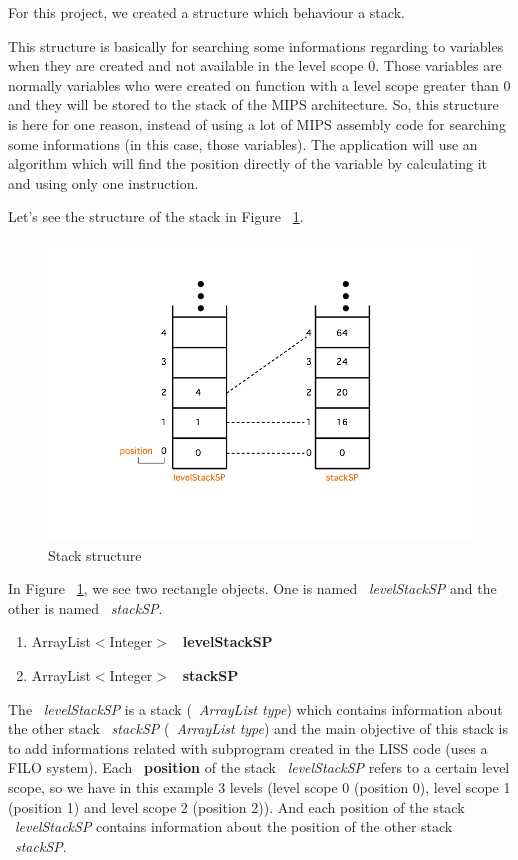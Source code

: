 \documentclass[
  oneside,
  11pt, a4paper,
  footinclude=true,
  headinclude=true,
  cleardoublepage=empty
]{scrbook}
\begin{document}
For this project, we created a structure which behaviour a stack. 

This structure is basically for searching some informations regarding to variables when they are created and not available in the level scope 0. Those variables are normally variables who were created on function with a level scope greater than 0 and they will be stored to the stack of the MIPS architecture.
So, this structure is here for one reason, instead of using a lot of MIPS assembly code for searching some informations (in this case, those variables). The application will use an algorithm which will find the position directly of the variable by calculating it and using only one instruction.

Let's see the structure of the stack in Figure ~\ref{fig:stack_symbol_table}.

\begin{figure}[h!]
  \centering
    \includegraphics[width=1\textwidth]{img/stackSymbolTable.png}
    \caption{Stack structure}
    \label{fig:stack_symbol_table}
\end{figure}

In Figure ~\ref{fig:stack_symbol_table}, we see two rectangle objects. One is named ~\textit{levelStackSP} and the other is named ~\textit{stackSP}.

\begin{enumerate}
\item ArrayList$<$Integer$>$ ~\textbf{levelStackSP}
\item ArrayList$<$Integer$>$ ~\textbf{stackSP}
\end{enumerate}

The ~\textit{levelStackSP} is a stack (~\textit{ArrayList type}) which contains information about the other stack ~\textit{stackSP} (~\textit{ArrayList type}) and the main objective of this stack is to add informations related with subprogram created in the LISS code (uses a FILO system). Each ~\textbf{position} of the stack ~\textit{levelStackSP} refers to a certain level scope, so we have in this example 3 levels (level scope 0 (position 0), level scope 1 (position 1) and level scope 2 (position 2)). And each position of the stack ~\textit{levelStackSP} contains information about the position of the other stack ~\textit{stackSP}.
\end{document}
